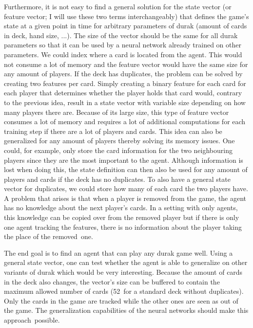 \documentclass[a4paper,titlepage]{article}
\begin{document}
Furthermore, it is not easy to find a general solution for the state vector (or feature vector; I will use these two terms interchangeably) that defines the game's state at a given point in time for arbitrary parameters of durak (amount of cards in deck, hand size, ...). The size of the vector should be the same for all durak parameters so that it can be used by a neural network already trained on other parameters.
We could index where a card is located from the agent. This would not consume a lot of memory and the feature vector would have the same size for any amount of players. If the deck has duplicates, the problem can be solved by creating two features per card.
Simply creating a binary feature for each card for each player that determines whether the player holds that card would, contrary to the previous idea, result in a state vector with variable size depending on how many players there are. Because of its large size, this type of feature vector consumes a lot of memory and requires a lot of additional computations for each training step if there are a lot of players and cards.
This idea can also be generalized for any amount of players thereby solving its memory issues. One could, for example, only store the card information for the two neighbouring players since they are the most important to the agent. Although information is lost when doing this, the state definition can then also be used for any amount of players and cards if the deck has no duplicates. To also have a general state vector for duplicates, we could store how many of each card the two players have. A problem that arises is that when a player is removed from the game, the agent has no knowledge about the next player's cards. In a setting with only agents, this knowledge can be copied over from the removed player but if there is only one agent tracking the features, there is no information about the player taking the place of the removed~one.

The end goal is to find an agent that can play any durak game well. Using a general state vector, one can test whether the agent is able to generalize on other variants of durak which would be very interesting. 
Because the amount of cards in the deck also changes, the vector's size can be buffered to contain the maximum allowed number of cards (52~for a standard deck without duplicates). Only the cards in the game are tracked while the other ones are seen as out of the game. The generalization capabilities of the neural networks should make this approach~possible.
\end{document}
